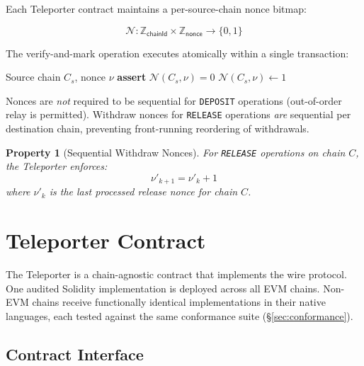 \documentclass[11pt]{article}
\newtheorem{property}{Property}
\begin{document}
Each Teleporter contract maintains a per-source-chain nonce bitmap:

\begin{equation}
  \mathcal{N}: \mathbb{Z}_{\mathsf{chainId}} \times \mathbb{Z}_{\mathsf{nonce}} \to \{0, 1\}
\end{equation}

The verify-and-mark operation executes atomically within a single transaction:

\begin{algorithm}[H]
\caption{Atomic Nonce Check-and-Set}
\begin{algorithmic}[1]
\Require Source chain $C_s$, nonce $\nu$
\State \textbf{assert} $\mathcal{N}(C_s, \nu) = 0$ 
\State $\mathcal{N}(C_s, \nu) \leftarrow 1$
\end{algorithmic}
\end{algorithm}

Nonces are \emph{not} required to be sequential for \texttt{DEPOSIT} operations (out-of-order relay is permitted). Withdraw nonces for \texttt{RELEASE} operations \emph{are} sequential per destination chain, preventing front-running reordering of withdrawals.

\begin{property}[Sequential Withdraw Nonces]
\label{prop:seq-nonce}
For \texttt{RELEASE} operations on chain $C$, the Teleporter enforces:
\begin{equation}
  \nu'_{k+1} = \nu'_k + 1
\end{equation}
where $\nu'_k$ is the last processed release nonce for chain $C$.
\end{property}

\section{Teleporter Contract}
\label{sec:teleporter}

The Teleporter is a chain-agnostic contract that implements the wire protocol. One audited Solidity implementation is deployed across all EVM chains. Non-EVM chains receive functionally identical implementations in their native languages, each tested against the same conformance suite (\S\ref{sec:conformance}).

\subsection{Contract Interface}
\end{document}
